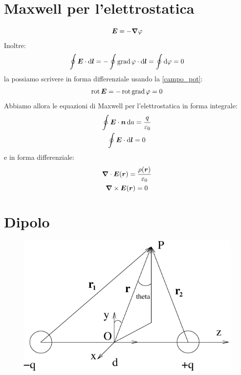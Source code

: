 \section{Maxwell per l'elettrostatica}
\begin{equation}
  \boldsymbol{E}=-\boldsymbol{\nabla}\varphi
  \label{campo_pot}
\end{equation}
Inoltre:
\[\oint\boldsymbol{E}\cdot\mathrm{d}\boldsymbol{l}=-\oint\operatorname{grad}\varphi\cdot\mathrm{d}\boldsymbol{l}=\oint\mathrm{d}\varphi=0\]
la possiamo scrivere in forma differenziale usando la \eqref{campo_pot}:
\[\operatorname{rot}\boldsymbol{E}=-\operatorname{rot}\operatorname{grad}\varphi=0\]
Abbiamo allora le equazioni di Maxwell per l'elettrostatica in forma integrale:
\begin{subequations}
  \begin{gather}
    \oint\boldsymbol{E}\cdot\boldsymbol{n}\,\mathrm{d} a=\frac{q}{\varepsilon_0}\\
    \oint\boldsymbol{E}\cdot\mathrm{d}\boldsymbol{l}=0
  \end{gather}
\end{subequations}
e in forma differenziale:
\begin{subequations}
  \begin{gather}
    \boldsymbol{\nabla}\cdot\boldsymbol{E}(\boldsymbol{r})=\frac{\rho(\boldsymbol{r})}{\varepsilon_0}\\
    \boldsymbol{\nabla}\times \boldsymbol{E}(\boldsymbol{r})=0
  \end{gather}
\end{subequations}
\section{Dipolo}
\begin{figure}[htbp]
  \centering
  \includegraphics[scale=0.8]{immagini/fisica2/dipolo}
\end{figure}
